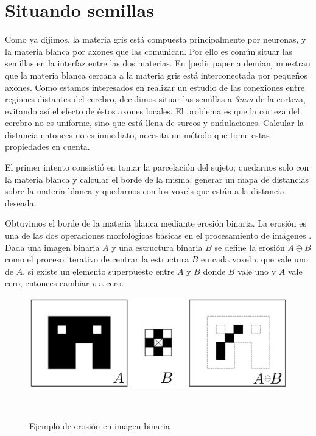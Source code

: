 \section{Situando semillas}
Como ya dijimos, la materia gris est\'a compuesta principalmente por neuronas,
y la materia blanca por axones que las comunican. Por ello es com\'un situar
las semillas en la interfaz entre las dos materias.  
En [pedir paper a demian] muestran que la materia blanca cercana a la materia gris 
est\'a interconectada por peque\~nos axones. Como estamos interesados en realizar
un estudio de las conexiones entre regiones distantes del cerebro, decidimos
situar las semillas a \textit{3mm} de la corteza, evitando as\'i el efecto de
\'estos axones locales. El problema es que la corteza del cerebro no es uniforme,
sino que est\'a llena de surcos y ondulaciones. Calcular la distancia entonces
no es inmediato, necesita un m\'etodo que tome estas propiedades en cuenta. 

El primer intento consisti\'o en tomar la parcelaci\'on del sujeto; quedarnos solo 
con la materia blanca y calcular el borde de la misma; generar un
mapa de distancias sobre la materia blanca y quedarnos con los voxels que est\'an
a la distancia deseada. 

Obtuvimos el borde de la materia blanca mediante erosi\'on binaria. La erosi\'on
es una de las dos operaciones morfol\'ogicas b\'asicas en el procesamiento de
im\'agenes \cite{Serra1983}. Dada una imagen binaria $A$ y una estructura binaria
$B$ se define la erosi\'on $ A \ominus B $ como el proceso iterativo de centrar
la estructura $B$ en cada voxel $v$ que vale uno de $A$, si existe un elemento
superpuesto entre $A$ y $B$ donde $B$ vale uno y $A$ vale cero, entonces cambiar
$v$ a cero. \\

\begin{figure}[h!]
                                                                                                                        
\begin{minipage}[b]{\textwidth}
    \includegraphics[width=\textwidth]{img/erosion.png}
    \caption{Ejemplo de erosi\'on en imagen binaria}
\end{minipage} ~

\end{figure}  

